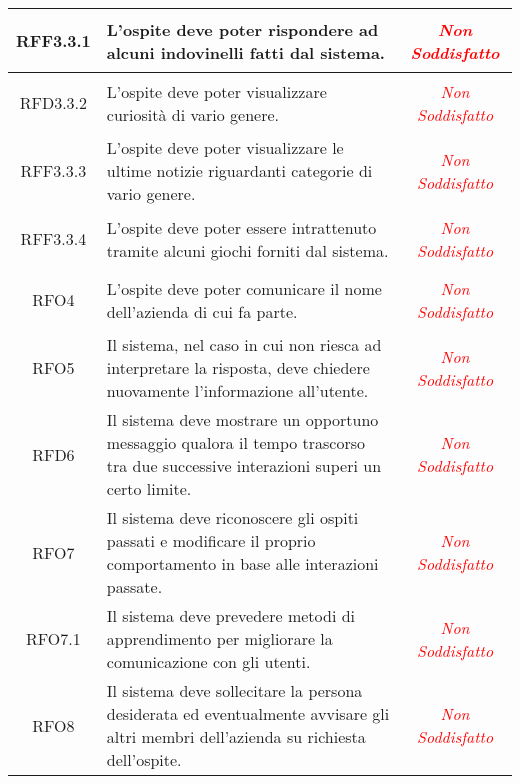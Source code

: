 \begin{longtable}{|c|>{\centering}m{7cm}|c|}
\hypertarget{RFF3.3.1}{RFF3.3.1} & L'ospite deve poter rispondere ad alcuni indovinelli fatti dal sistema. & \textcolor{Red}{\textit{Non Soddisfatto}}\\ \hline

\hypertarget{RFD3.3.2}{RFD3.3.2} & L'ospite deve poter visualizzare curiosità  di vario genere. & \textcolor{Red}{\textit{Non Soddisfatto}}\\ \hline

\hypertarget{RFF3.3.3}{RFF3.3.3} & L'ospite deve poter visualizzare le ultime notizie riguardanti categorie di vario genere. & \textcolor{Red}{\textit{Non Soddisfatto}}\\ \hline

\hypertarget{RFF3.3.4}{RFF3.3.4} & L'ospite deve poter essere intrattenuto tramite alcuni giochi forniti dal sistema. & \textcolor{Red}{\textit{Non Soddisfatto}}\\ \hline

\hypertarget{RFO4}{RFO4} & L'ospite deve poter comunicare il nome dell'azienda di cui fa parte. & \textcolor{Red}{\textit{Non Soddisfatto}}\\ \hline

\hypertarget{RFO5}{RFO5} & Il sistema, nel caso in cui non riesca ad interpretare la risposta, deve chiedere nuovamente l'informazione all'utente. & \textcolor{Red}{\textit{Non Soddisfatto}}\\ \hline

\hypertarget{RFD6}{RFD6} & Il sistema deve mostrare un opportuno messaggio qualora il tempo trascorso tra due successive interazioni superi un certo limite. & \textcolor{Red}{\textit{Non Soddisfatto}}\\ \hline

\hypertarget{RFO7}{RFO7} & Il sistema deve riconoscere gli ospiti passati e modificare il proprio comportamento in base alle interazioni passate. & \textcolor{Red}{\textit{Non Soddisfatto}}\\ \hline

\hypertarget{RFO7.1}{RFO7.1} & Il sistema deve prevedere metodi di apprendimento per migliorare la comunicazione con gli utenti. & \textcolor{Red}{\textit{Non Soddisfatto}}\\ \hline

\hypertarget{RFO8}{RFO8} & Il sistema deve sollecitare la persona desiderata ed eventualmente avvisare gli altri membri dell'azienda su richiesta dell'ospite. & \textcolor{Red}{\textit{Non Soddisfatto}}\\ \hline


\end{longtable}
